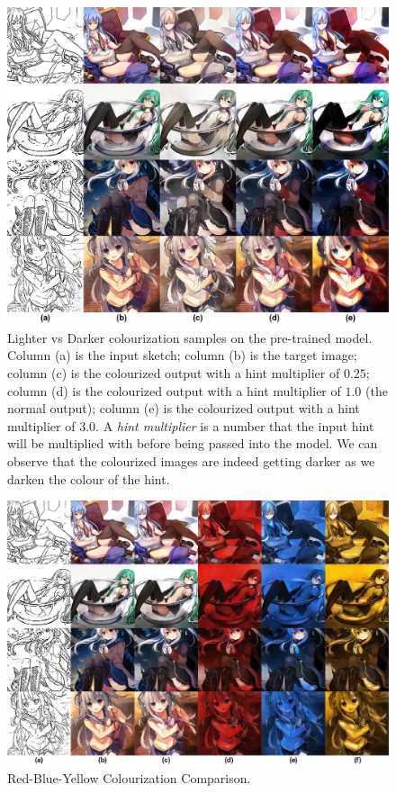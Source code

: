 \begin{figure}
    \centering
    \includegraphics[width=1.0\textwidth]{images/colorization/lighter_vs_darker.png}
    \caption{Lighter vs Darker colourization samples on the pre-trained model. Column (a) is the input sketch; column (b) is the target image; column (c) is the colourized output with a hint multiplier of $0.25$; column (d) is the colourized output with a hint multiplier of $1.0$ (the normal output); column (e) is the colourized output with a hint multiplier of $3.0$. A \textit{hint multiplier} is a number that the input hint will be multiplied with before being passed into the model. We can observe that the colourized images are indeed getting darker as we darken the colour of the hint.}
    \label{fig:lighter_vs_darker}
\end{figure}

\begin{figure}
    \centering
    \includegraphics[width=1.0\textwidth]{images/colorization/RYB_comparison.png}
    \caption{Red-Blue-Yellow Colourization Comparison.}
    \label{fig:ryb_comparison}
\end{figure}



